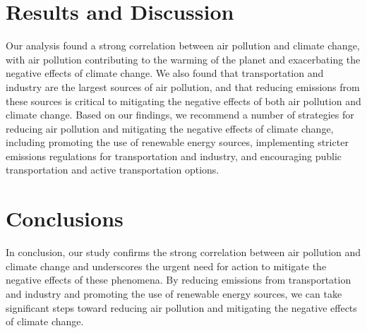 \documentclass[12pt]{article}
\begin{document}
\section{Results and Discussion}
Our analysis found a strong correlation between air pollution and climate change, with air pollution contributing to the warming of the planet and exacerbating the negative effects of climate change. We also found that transportation and industry are the largest sources of air pollution, and that reducing emissions from these sources is critical to mitigating the negative effects of both air pollution and climate change. Based on our findings, we recommend a number of strategies for reducing air pollution and mitigating the negative effects of climate change, including promoting the use of renewable energy sources, implementing stricter emissions regulations for transportation and industry, and encouraging public transportation and active transportation options.

\section{Conclusions}
In conclusion, our study confirms the strong correlation between air pollution and climate change and underscores the urgent need for action to mitigate the negative effects of these phenomena. By reducing emissions from transportation and industry and promoting the use of renewable energy sources, we can take significant steps toward reducing air pollution and mitigating the negative effects of climate change.



\end{document}
